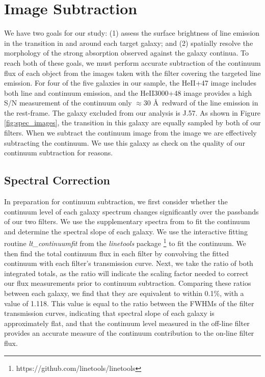 \documentclass[twocolumn]{aastex61}
\begin{document}
\section{Image Subtraction}\label{sec.cont_sub}
We have two goals for our study: (1) assess the surface brightness of line emission in the  transition in and around each target galaxy; and (2) spatially resolve the morphology of the strong  absorption observed against the galaxy continua.
To reach both of these goals, we must perform accurate subtraction of the continuum flux of each object from the images taken with the filter covering the targeted line emission. For four of the five galaxies in our sample, the HeII+47 image includes both line and continuum emission, and the HeII3000+48 image provides a high S/N measurement of the continuum only $\approx30$ \AA\ redward of the line emission in the rest-frame. The galaxy excluded from our analysis is J.57. As shown in Figure \ref{fig:spec_images}, the  transition in this galaxy are equally sampled by both of our filters. When we subtract the continuum image from the  image we are effectively subtracting the  continuum. We use this galaxy as check on the quality of our continuum subtraction for reasons.

\subsection{Spectral Correction}
In preparation for continuum subtraction, we first consider whether the continuum level of each galaxy spectrum changes significantly over the passbands of our two filters.
We use the supplementary spectra from \citet{Rubin_2014} to fit the continuum and determine the spectral slope of each galaxy. We use the interactive fitting routine \emph{lt\_continuumfit} from the \emph{linetools} package \citep{Prochaska2016}\footnote{https://github.com/linetools/linetools} to fit the continuum. We then find the total continuum flux in each filter by convolving the fitted continuum with each filter's transmission curve. Next, we take the ratio of both integrated totals, as the ratio will indicate the scaling factor needed to correct our flux measurements prior to continuum subtraction. Comparing these ratios between each galaxy, we find that they are equivalent to within 0.1\%, with a value of 1.118. This value is equal to the ratio between the FWHMs of the filter transmission curves, indicating that spectral slope of each galaxy is approximately flat, and that the continuum level measured in the off-line filter provides an accurate measure of the continuum contribution to the on-line filter flux.
\end{document}
